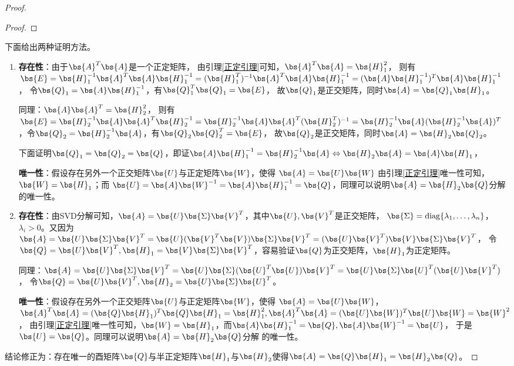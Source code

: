 \documentclass[12pt, a4paper, oneside, UTF8]{ctexbook}
\begin{document}
\begin{proof}
\begin{proof}
    \end{proof}
    下面给出两种证明方法。
    \begin{enumerate}[label=(\arabic*)]
        \item 
    \textbf{存在性}：由于$\bs{A}^T\bs{A}$是一个正定矩阵，
    由引理\ref{正定引理}可知，$\bs{A}^T\bs{A}=\bs{H}_1^2$，
    则有$\bs{E}=\bs{H}_1^{-1}\bs{A}^T\bs{A}\bs{H}_1^{-1}=
    (\bs{H}_1^T)^{-1}\bs{A}^T\bs{A}\bs{H}_1^{-1}
    =(\bs{A}\bs{H}_1^{-1})^T\bs{A}\bs{H}_1^{-1}$，
    令$\bs{Q}_1=\bs{A}\bs{H}_1^{-1}$，有$\bs{Q}_1^T\bs{Q}_1=\bs{E}$，
    故$\bs{Q}_1$是正交矩阵，同时$\bs{A}=\bs{Q}_1\bs{H}_1$。
    
    同理：$\bs{A}\bs{A}^T=\bs{H}_2^2$，
    则有$\bs{E}=\bs{H}_2^{-1}\bs{A}\bs{A}^T\bs{H}_2^{-1}=\bs{H}_2^{-1}\bs{A}\bs{A}^T(\bs{H}_2^T)^{-1}
    =\bs{H}_2^{-1}\bs{A}(\bs{H}_2^{-1}\bs{A})^T$，令$\bs{Q}_2=\bs{H}_2^{-1}\bs{A}$，有$\bs{Q}_2\bs{Q}_2^T=\bs{E}$，
    故$\bs{Q}_2$是正交矩阵，同时$\bs{A}=\bs{H}_2\bs{Q}_2$。

    下面证明$\bs{Q}_1=\bs{Q}_2=\bs{Q}$，即证$\bs{A}\bs{H}_1^{-1}=\bs{H}_2^{-1}\bs{A} \Leftrightarrow \bs{H}_2\bs{A}=\bs{A}\bs{H}_1$，


    \textbf{唯一性}：假设存在另外一个正交矩阵$\bs{U}$与正定矩阵$\bs{W}$，使得
    $\bs{A}=\bs{U}\bs{W}$
    由引理\ref{正定引理}唯一性可知，$\bs{W}=\bs{H}_1$；而
    $\bs{U}=\bs{A}\bs{W}^{-1}=\bs{A}\bs{H}_1^{-1}=\bs{Q}$，同理可以说明$\bs{A}=\bs{H}_2\bs{Q}$分解
    的唯一性。
        
    \item
    \textbf{存在性}：由SVD分解可知，$\bs{A}=\bs{U}\bs{\Sigma}\bs{V}^T$，其中$\bs{U},\bs{V}^T$是正交矩阵，
    $\bs{\Sigma}=\mathrm{diag}\{\lambda_1,\ldots,\lambda_n\}$，$\lambda_i >0$。又因为
    $\bs{A}=\bs{U}\bs{\Sigma}\bs{V}^T=\bs{U}(\bs{V}^T\bs{V})\bs{\Sigma}\bs{V}^T=(\bs{U}\bs{V}^T)\bs{V}\bs{\Sigma}\bs{V}^T$，
    令$\bs{Q}=\bs{U}\bs{V}^T,\bs{H}_1=\bs{V}\bs{\Sigma}\bs{V}^T$，容易验证$\bs{Q}$为正交矩阵，$\bs{H}_1$为正定矩阵。

    同理：$\bs{A}=\bs{U}\bs{\Sigma}\bs{V}^T=\bs{U}\bs{\Sigma}(\bs{U}^T\bs{U})\bs{V}^T=\bs{U}\bs{\Sigma}\bs{U}^T(\bs{U}\bs{V}^T)$，
    令$\bs{Q}=\bs{U}\bs{V}^T,\bs{H}_2=\bs{U}\bs{\Sigma}\bs{U}^T$。
    
    \textbf{唯一性}：假设存在另外一个正交矩阵$\bs{U}$与正定矩阵$\bs{W}$，使得
    $\bs{A}=\bs{U}\bs{W}$，$\bs{A}^T\bs{A}=(\bs{Q}\bs{H}_1)^T\bs{Q}\bs{H}_1=\bs{H}_1^2,
    \bs{A}^T\bs{A}=(\bs{U}\bs{W})^T\bs{U}\bs{W}=\bs{W}^2$，
    由引理\ref{正定引理}唯一性可知，$\bs{W}=\bs{H}_1$，而$\bs{A}\bs{H}_1^{-1}=\bs{Q},\bs{A}\bs{W}^{-1}=\bs{U}$，
    于是$\bs{U}=\bs{Q}$。同理可以说明$\bs{A}=\bs{H}_2\bs{Q}$分解
    的唯一性。
\end{enumerate}
结论修正为：存在唯一的酉矩阵$\bs{Q}$与半正定矩阵$\bs{H}_1$与$\bs{H}_2$使得$\bs{A}=\bs{Q}\bs{H}_1=\bs{H}_2\bs{Q}$。

\end{proof}
\end{document}
